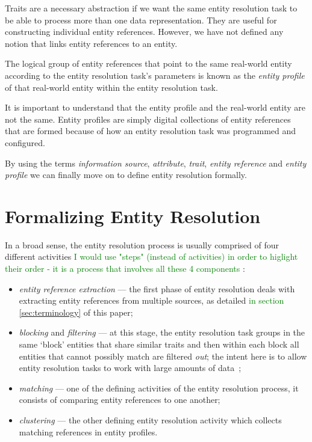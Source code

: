 \documentclass[journal]{IEEEtran}
\begin{document}
    Traits are a necessary abstraction if we want the same entity resolution
    task to be able to process more than one data representation.
    They are useful for constructing individual entity references.
    However, we have not defined any notion that links entity references to an
    entity.
    
    \begin{defn}
        The logical group of entity references that point to the same real-world
        entity according to the entity resolution task's parameters is known as
        the \textit{entity profile} of that real-world entity within the entity
        resolution task.
    \end{defn}

    It is important to understand that the entity profile and the real-world
    entity are not the same.
    Entity profiles are simply digital collections of entity references that are
    formed because of how an entity resolution task was programmed and
    configured.
    
    By using the terms \textit{information source}, \textit{attribute},
    \textit{trait}, \textit{entity reference} and \textit{entity profile} we can
    finally move on to define entity resolution formally.

    \section{Formalizing Entity Resolution}\label{sec:entity-resolution}

    In a broad sense, the entity resolution process is usually comprised of four
    different activities\cite{Pap19,Tal11}
    \textcolor{green}{I would use "steps" (instead of activities) in order to higlight their order - it is a process that involves all these 4 components}
    :
    \begin{itemize}
        \item \textit{entity reference extraction} --- the first phase of entity
        resolution deals with extracting entity references from multiple
        sources, as detailed  
        \textcolor{green}{in section \ref{sec:terminology}} 
        of this paper;
        \item \textit{blocking} and \textit{filtering} --- at this stage, the
        entity resolution task groups in the same `block' entities that share
        similar traits and then within each block all entities that cannot
        possibly match are filtered \textit{out}; the intent here is to allow
        entity resolution tasks to work with large amounts of data~\cite{Pap19};
        \item \textit{matching} --- one of the defining activities of the entity
        resolution process, it consists of comparing entity references to one
        another;
        \item \textit{clustering} --- the other defining entity resolution
        activity which collects matching references in entity profiles.
    \end{itemize}
\end{document}
